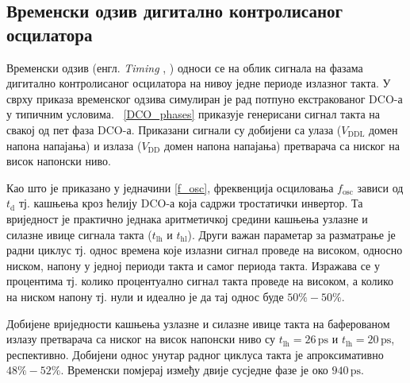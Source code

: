 \documentclass[master]{finthesis}
\makeatletter
\newcommand*{\engl}[2][\@empty]{%
    \edef\theacronym{#1}%
    (енгл. \foreignlanguage{english}{\emph{#2}%
    \ifx\theacronym\@empty \else , #1\fi})%
}
\def \DCO  {DCO} %
\makeatother
\begin{document}
\subsection{Временски одзив дигитално контролисаног осцилатора}
Временски одзив \engl{Timing} односи се на облик сигнала на фазама дигитално контролисаног осцилатора на нивоу једне периоде излазног такта. У сврху приказа временског одзива симулиран је рад потпуно екстракованог \DCO-а у типичним условима. \figurename~\ref{DCO_phases} приказује генерисани сигнал такта на свакој од пет фаза \DCO-а. Приказани сигнали су добијени са улаза ($V_\text{DDL}$ домен напона напајања) и излаза ($V_\text{DD}$ домен напона напајања) претварача са ниског на висок напонски ниво.

Као што је приказано у једначини \ref{f_osc}, фреквенција осциловања $f_\text{osc}$ зависи од $t_\text{d}$ тј. кашњења кроз ћелију \DCO-а која садржи тростатички инвертор. Та вриједност је практично једнака аритметичкој средини кашњења узлазне и силазне ивице сигнала такта ($t_\text{lh}$ и $t_\text{hl}$). Други важан параметар за разматрање је радни циклус тј. однос времена које излазни сигнал проведе на високом, односно ниском, напону у једној периоди такта и самог периода такта. Изражава се у процентима тј. колико процентуално сигнал такта проведе на високом, а колико на ниском напону тј. нули и идеално је да тај однос буде $50\%-50\%$. \par
Добијене вриједности кашњења узлазне и силазне ивице такта на баферованом излазу претварача са ниског на висок напонски ниво су $t_\text{lh}=26\,\text{ps}$ и $t_\text{lh}=20\,\text{ps}$, респективно. Добијени однос унутар радног циклуса такта је апроксимативно $48\%-52\%$. Временски помјерај између двије сусједне фазе је око $940\,\text{ps}$.
\end{document}
